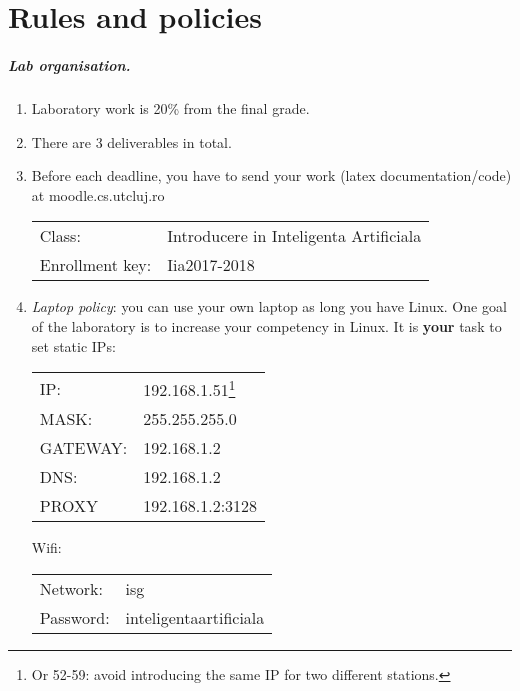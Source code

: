 \chapter{Rules and policies}



\paragraph{Lab organisation.} 


\begin{enumerate}
 \item Laboratory work is 20\% from the final grade. 
 \item There are 3 deliverables in total.
\item Before each deadline, you have to send your work (latex documentation/code) at moodle.cs.utcluj.ro

\begin{center}
\begin{tabular}{ll}
Class: & Introducere in Inteligenta Artificiala\\
Enrollment key: & Iia2017-2018\\
\end{tabular}

\end{center}


\item {\it Laptop policy}: you can use your own laptop as long you have Linux. One goal of the laboratory is to increase your competency in Linux. It is \textbf{your} task to set static IPs:
\begin{center}
\begin{tabular}{ll}
IP: & 192.168.1.51\footnote{Or 52-59: avoid introducing the same IP for two different stations.}\\ 
MASK:&  255.255.255.0\\
GATEWAY:&  192.168.1.2\\
DNS:& 192.168.1.2\\
PROXY & 192.168.1.2:3128\\
\end{tabular}

Wifi:
\begin{tabular}{ll}
Network: &isg\\
Password: &inteligentaartificiala\\
\end{tabular}
\end{center}


\end{enumerate}
